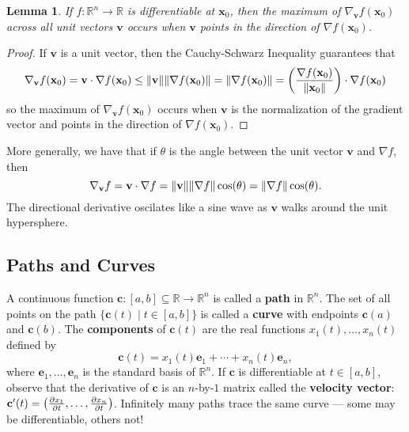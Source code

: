 \documentclass[11pt]{article}
\newtheorem*{lemma*}{Lemma}
\renewcommand{\vec}[1]{\mathbf{#1}}
\renewcommand{\grad}{\nabla}
\begin{document}
\begin{adjustwidth}{1cm}{}
	\begin{lemma*}
		If $f: \mathbb{R}^{n} \to \mathbb{R}$ is differentiable at $\vec{x}_{0}$, then the maximum of $\grad_{\vec{v}} f(\vec{x}_{0})$ across all unit vectors $\vec{v}$ occurs when $\vec{v}$ points in the direction of $\grad f(\vec{x}_{0})$.
	\end{lemma*}
    \begin{proof}\renewcommand{\qedsymbol}{}
		If $\vec{v}$ is a unit vector, then the Cauchy-Schwarz Inequality guarantees that
		\[
			\grad_{\vec{v}} f(\vec{x}_{0}) = \vec{v} \cdot \grad f(\vec{x}_{0}) \le \norm{\vec{v}} \norm{\grad f (\vec{x}_{0})} = \norm{\grad f(\vec{x}_{0})} = \left( \frac{\grad f(\vec{x}_{0})}{\norm{\vec{x}_{0}}} \right) \cdot \grad f (\vec{x}_{0})
		\]
		so the maximum of $\grad_{\vec{v}} f(\vec{x}_{0})$ occurs when $\vec{v}$ is the normalization of the gradient vector and points in the direction of $\grad f (\vec{x}_{0})$.
	\end{proof}
\end{adjustwidth}

More generally, we have that if $\theta$ is the angle between the unit vector $\vec{v}$ and $\grad f$, then 
\[
	\grad_{\vec{v}} f = \vec{v} \cdot \grad f = \norm{\vec{v}} \norm{\grad f} \cos(\theta) = \norm{\grad f} \cos(\theta).
\]
The directional derivative oscilates like a sine wave as $\vec{v}$ walks around the unit hypersphere.


\subsection{Paths and Curves}

A continuous function $\vec{c}: [a, b] \subseteq \mathbb{R} \to \mathbb{R}^{n}$ is called a \textbf{path} in $\mathbb{R}^{n}$. The set of all points on the path $\{ \vec{c}(t) \mid t \in [a, b] \}$ is called a \textbf{curve} with endpoints $\vec{c}(a)$ and $\vec{c}(b)$. The \textbf{components} of $\vec{c}(t)$ are the real functions $x_{1}(t), \ldots, x_{n}(t)$ defined by
\[
	\vec{c}(t) = x_{1}(t) \vec{e}_{1} + \cdots + x_{n}(t) \vec{e}_{n},
\]
where $\vec{e}_{1}, \ldots, \vec{e}_{n}$ is the standard basis of $\mathbb{R}^{n}$. If $\vec{c}$ is differentiable at $t \in [a, b]$, observe that the derivative of $\vec{c}$ is an $n$-by-$1$ matrix called the \textbf{velocity vector}: $\vec{c}'(t) = \left( \pdv{x_{1}}{t}, \ldots, \pdv{x_{n}}{t} \right)$. Infinitely many paths trace the same curve --- some may be differentiable, others not! 
\end{document}

